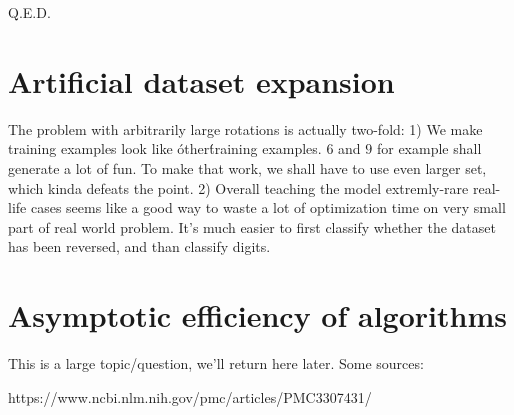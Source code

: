 \documentclass{article}
\begin{document}
Q.E.D.

\section{Artificial dataset expansion}
The problem with arbitrarily large rotations is actually two-fold:
1) We make training examples look like \'other\' training examples. $6$ and $9$ for example shall generate a lot of fun.
To make that work, we shall have to use even larger set, which kinda defeats the point.
2) Overall teaching the model extremly-rare real-life cases seems like a good way
to waste a lot of optimization time on very small part of real world problem. It's much easier to first classify whether the dataset has been reversed, and than classify digits.

\section{Asymptotic efficiency of algorithms}
This is a large topic/question, we'll return here later. Some sources:

https://www.ncbi.nlm.nih.gov/pmc/articles/PMC3307431/
\end{document}
